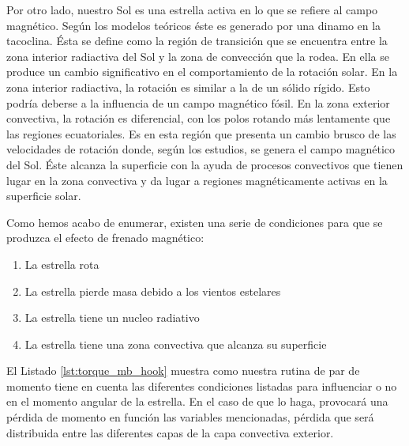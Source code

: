 Por otro lado, nuestro Sol es una estrella activa en lo que se refiere al campo magnético. Según los modelos teóricos éste es generado por una dinamo en la tacoclina. Ésta se define como la región de transición que se encuentra entre la zona interior radiactiva del Sol y la zona de convección que la rodea. En ella se produce un cambio significativo en el comportamiento de la rotación solar. En la zona interior radiactiva, la rotación es similar a la de un sólido rígido. Esto podría deberse a la influencia de un campo magnético fósil.
En la zona exterior convectiva, la rotación es diferencial, con los polos rotando más lentamente que las regiones ecuatoriales. Es en esta región que presenta un cambio brusco de las velocidades de rotación donde, según los estudios, se genera el campo magnético del Sol. Éste alcanza la superficie con la ayuda de procesos convectivos que tienen lugar en la zona convectiva y da lugar a regiones magnéticamente activas en la superficie solar.\par


Como hemos acabo de enumerar, existen una serie de condiciones para que se produzca el efecto de frenado magnético:

\begin{enumerate}
	\item La estrella rota
	\item La estrella pierde masa debido a los vientos estelares
	\item La estrella tiene un nucleo radiativo
	\item La estrella tiene una zona convectiva que alcanza su superficie
\end{enumerate}

El Listado \ref{lst:torque_mb_hook} muestra como nuestra rutina de par de momento tiene en cuenta las diferentes condiciones listadas para influenciar o no en el momento angular de la estrella. En el caso de que lo haga, provocará una pérdida de momento en función las variables mencionadas, pérdida que será distribuida entre las diferentes capas de la capa convectiva exterior.

